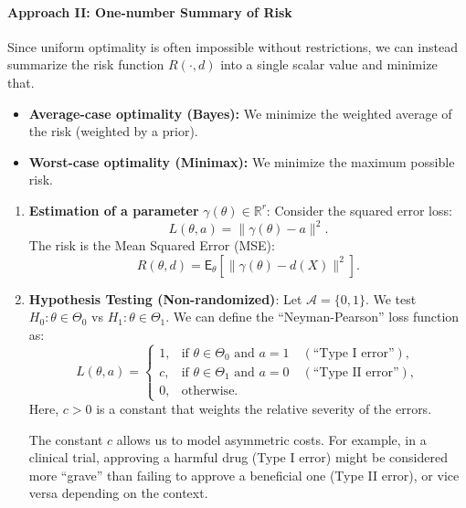 \paragraph{Approach II: One-number Summary of Risk}
Since uniform optimality is often impossible without restrictions, we can instead summarize the risk function \(R(\cdot, d)\) into a single scalar value and minimize that.
\begin{itemize}
    \item \textbf{Average-case optimality (Bayes):} We minimize the weighted average of the risk (weighted by a prior).
    \item \textbf{Worst-case optimality (Minimax):} We minimize the maximum possible risk.
\end{itemize}

\begin{ex}[continued]
    \leavevmode
\begin{enumerate}[label=\roman*.]
    \item \textbf{Estimation of a parameter} \(\gamma(\theta) \in \mathbb{R}^r\):
    Consider the squared error loss:
    \[
    L(\theta, a) = \|\gamma(\theta) - a\|^2.
    \]
    The risk is the Mean Squared Error (MSE):
    \[
    R(\theta, d) = \mathsf{E}_{\theta} [\|\gamma(\theta) - d(X)\|^2].
    \]

    \item \textbf{Hypothesis Testing (Non-randomized)}:
    Let \(\mathcal{A} = \{0, 1\}\). We test \(H_0: \theta \in \Theta_0\) vs \(H_1: \theta \in \Theta_1\).
    We can define the ``Neyman-Pearson'' loss function as:
    \[
    L(\theta,a) = 
    \begin{cases} 
    1, & \text{if } \theta \in \Theta_0 \text{ and } a = 1 \quad (\text{``Type I error''}), \\ 
    c, & \text{if } \theta \in \Theta_1 \text{ and } a = 0 \quad (\text{``Type II error''}), \\ 
    0, & \text{otherwise}. 
    \end{cases}
    \]
    Here, \(c > 0\) is a constant that weights the relative severity of the errors. 
   
    \begin{note}[]
    The constant \(c\) allows us to model asymmetric costs. For example, in a clinical trial, approving a harmful drug (Type I error) might be considered more ``grave'' than failing to approve a beneficial one (Type II error), or vice versa depending on the context.
    \end{note}
    

\end{enumerate}
\end{ex}
